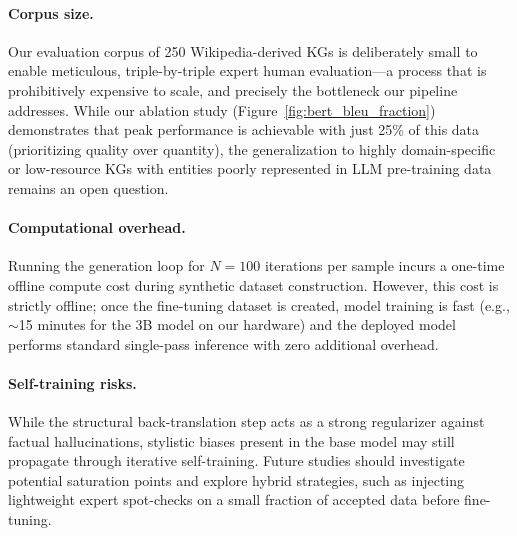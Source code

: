 \documentclass[11pt]{article}
\begin{document}
\paragraph{Corpus size.}
Our evaluation corpus of 250 Wikipedia-derived KGs is deliberately small to enable meticulous, triple-by-triple expert human evaluation---a process that is prohibitively expensive to scale, and precisely the bottleneck our pipeline addresses. While our ablation study (Figure~\ref{fig:bert_bleu_fraction}) demonstrates that peak performance is achievable with just 25\% of this data (prioritizing quality over quantity), the generalization to highly domain-specific or low-resource KGs with entities poorly represented in LLM pre-training data remains an open question.

\paragraph{Computational overhead.}
Running the generation loop for $N = 100$ iterations per sample incurs a one-time offline compute cost during synthetic dataset construction. However, this cost is strictly offline; once the fine-tuning dataset is created, model training is fast (e.g., $\sim$15 minutes for the 3B model on our hardware) and the deployed model performs standard single-pass inference with zero additional overhead.

\paragraph{Self-training risks.}
While the structural back-translation step acts as a strong regularizer against factual hallucinations, stylistic biases present in the base model may still propagate through iterative self-training. Future studies should investigate potential saturation points and explore hybrid strategies, such as injecting lightweight expert spot-checks on a small fraction of accepted data before fine-tuning.
\end{document}
